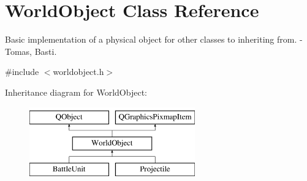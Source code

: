 \hypertarget{class_world_object}{}\section{World\+Object Class Reference}
\label{class_world_object}


Basic implementation of a physical object for other classes to inheriting from. -\/ Tomas, Basti.  




{\ttfamily \#include $<$worldobject.\+h$>$}

Inheritance diagram for World\+Object\+:\begin{figure}[H]
\begin{center}
\leavevmode
\includegraphics[height=3.000000cm]{class_world_object}
\end{center}
\end{figure}
